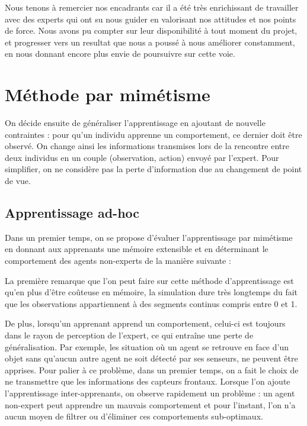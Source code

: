 \documentclass[a4paper, 12pt]{report}
\begin{document}
    
    Nous tenons à remercier nos encadrants car il a été très enrichissant de travailler avec des experts qui ont su nous guider en valorisant nos attitudes et nos points de force. Nous avons pu compter sur leur disponibilité à tout moment du projet, et progresser vers un resultat que nous a poussé à nous améliorer constamment, en nous donnant encore plus envie de poursuivre sur cette voie.  
    
    
	\section{Méthode par mimétisme}
	On décide ensuite de généraliser l'apprentissage en ajoutant de nouvelle contraintes : pour qu'un individu apprenne un comportement, ce dernier doit être observé. On change ainsi les informations transmises lors de la rencontre entre deux individus en un couple (observation, action) envoyé par l'expert.
	Pour simplifier, on ne considère pas la perte d'information due au changement de point de vue.
	\subsection{Apprentissage ad-hoc}
	Dans un premier temps, on se propose d'évaluer l'apprentissage par mimétisme en donnant aux apprenants une mémoire extensible et en déterminant le comportement des agents non-experts de la manière suivante :

	
	La première remarque que l'on peut faire sur cette méthode d'apprentissage est qu'en plus d'être coûteuse en mémoire, la simulation dure très longtemps du fait que les observations appartiennent à des segments continus compris entre 0 et 1.
	
	De plus, lorsqu'un apprenant apprend un comportement, celui-ci est toujours dans le rayon de perception de l'expert, ce qui entraîne une perte de généralisation. Par exemple, les situation où un agent se retrouve en face d'un objet sans qu'aucun autre agent ne soit détecté par ses senseurs, ne peuvent être apprises.
	Pour palier à ce problème, dans un premier temps, on a fait le choix de ne transmettre que les informations des capteurs frontaux.
	Lorsque l'on ajoute l'apprentissage inter-apprenants, on observe rapidement un problème : un agent non-expert peut apprendre un mauvais comportement et pour l'instant, l'on n'a aucun moyen de filtrer ou d'éliminer ces comportements sub-optimaux.
	
\end{document}
